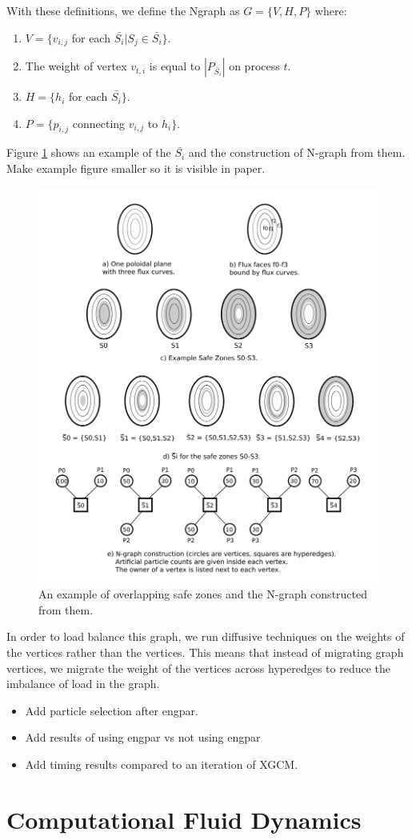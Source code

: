 \documentclass[conference]{IEEEtran}
\begin{document}
With these definitions, we define the Ngraph as $G = \{V, H, P\}$ where:
\begin{enumerate}
\item $V = \{ v_{i,j}$ for each $\bar{S_i} | S_j \in \bar{S_i} \}$.
\item The weight of vertex $v_{t,i}$ is equal to $|P_{\bar{S_i}}|$ on process $t$.
\item $H = \{ h_i$ for each $\bar{S_i} \}$.
\item $P = \{ p_{i,j}$ connecting $v_{i,j}$ to $h_i \}$.
\end{enumerate}
Figure \ref{fig:sbars} shows an example of the $\bar{S_i}$ and the construction of N-graph from
them. {\color{red} Make example figure smaller so it is visible in paper.}

\begin{figure}[!ht]
  \centering
  \includegraphics[width=.4\textwidth]{../figures/xgcm_ngraph_construction.png}
  \caption{An example of overlapping safe zones and the N-graph constructed from them.}
  \label{fig:sbars}
\end{figure}

In order to load balance this graph, we run diffusive techniques on the weights of the vertices
rather than the vertices. This means that instead of migrating graph vertices, we migrate the
weight of the vertices across hyperedges to reduce the imbalance of load in the graph.

\begin{itemize}
\item Add particle selection after engpar.
\item Add results of using engpar vs not using engpar
\item Add timing results compared to an iteration of XGCM.
\end{itemize}

\section{Computational Fluid Dynamics}
\end{document}
